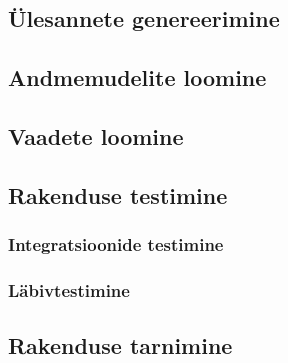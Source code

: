 \subsection{Ülesannete genereerimine}

\subsection{Andmemudelite loomine}

\subsection{Vaadete loomine}

\subsection{Rakenduse testimine}

\subsubsection{Integratsioonide testimine}

\subsubsection{Läbivtestimine}

\subsection{Rakenduse tarnimine}

